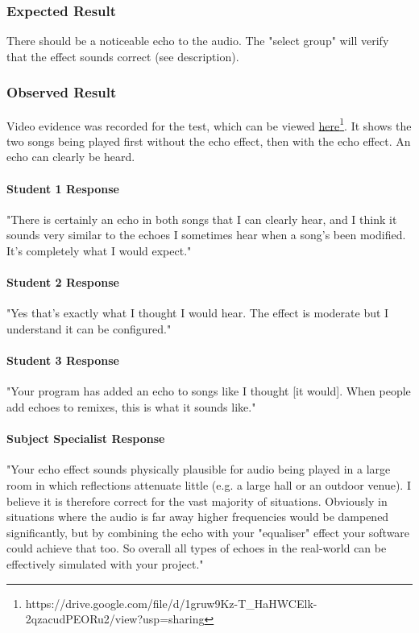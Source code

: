 \subsubsection{Expected Result}
There should be a noticeable echo to the audio. The "select group" will verify that the effect sounds correct (see description).

\subsubsection{Observed Result}
\label{sec:evidence4.1}
Video evidence was recorded for the test, which can be viewed \href{https://drive.google.com/file/d/1gruw9Kz-T_HaHWCElk-2qzacudPEORu2/view?usp=sharing}{here}\footnote{
	https://drive.google.com/file/d/1gruw9Kz-T\_HaHWCElk-2qzacudPEORu2/view?usp=sharing
}. It shows the two songs being played first without the echo effect, then with the echo effect. An echo can clearly be heard.

\paragraph{Student 1 Response}
"There is certainly an echo in both songs that I can clearly hear, and I think it sounds very similar to the echoes I sometimes hear when a song's been modified. It's completely what I would expect."

\paragraph{Student 2 Response}
"Yes that's exactly what I thought I would hear. The effect is moderate but I understand it can be configured."

\paragraph{Student 3 Response}
"Your program has added an echo to songs like I thought [it would]. When people add echoes to remixes, this is what it sounds like." 

\paragraph{Subject Specialist Response}
"Your echo effect sounds physically plausible for audio being played in a large room in which reflections attenuate little (e.g. a large hall or an outdoor venue). I believe it is therefore correct for the vast majority of situations. Obviously in situations where the audio is far away higher frequencies would be dampened significantly, but by combining the echo with your "equaliser" effect your software could achieve that too. So overall all types of echoes in the real-world can be effectively simulated with your project."

